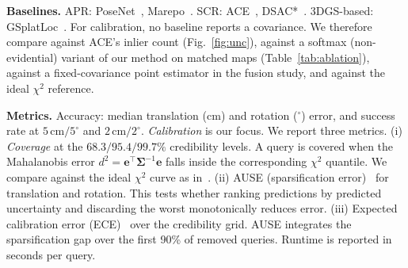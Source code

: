 \documentclass[journal]{IEEEtran}
\begin{document}
\textbf{Baselines.} APR: PoseNet~\cite{posenet}, Marepo~\cite{marepo}. SCR: ACE~\cite{ace}, DSAC*~\cite{dsacstar}. 3DGS-based: GSplatLoc~\cite{gsplatloc}. For calibration, no baseline reports a covariance. We therefore compare against ACE's inlier count (Fig.~\ref{fig:unc}), against a softmax (non-evidential) variant of our method on matched maps (Table~\ref{tab:ablation}), against a fixed-covariance point estimator in the fusion study, and against the ideal $\chi^2$ reference.

\textbf{Metrics.} Accuracy: median translation (cm) and rotation ($^\circ$) error, and success rate at $5\,\mathrm{cm}/5^\circ$ and $2\,\mathrm{cm}/2^\circ$. \emph{Calibration} is our focus. We report three metrics. (i) \emph{Coverage} at the $68.3/95.4/99.7\%$ credibility levels. A query is covered when the Mahalanobis error $d^2=\mathbf{e}^\top\bm\Sigma^{-1}\mathbf{e}$ falls inside the corresponding $\chi^2$ quantile. We compare against the ideal $\chi^2$ curve as in~\cite{ksenet}. (ii) AUSE (sparsification error)~\cite{ause} for translation and rotation. This tests whether ranking predictions by predicted uncertainty and discarding the worst monotonically reduces error. (iii) Expected calibration error (ECE)~\cite{guo_calibration} over the credibility grid. AUSE integrates the sparsification gap over the first 90\% of removed queries. Runtime is reported in seconds per query.
\end{document}
